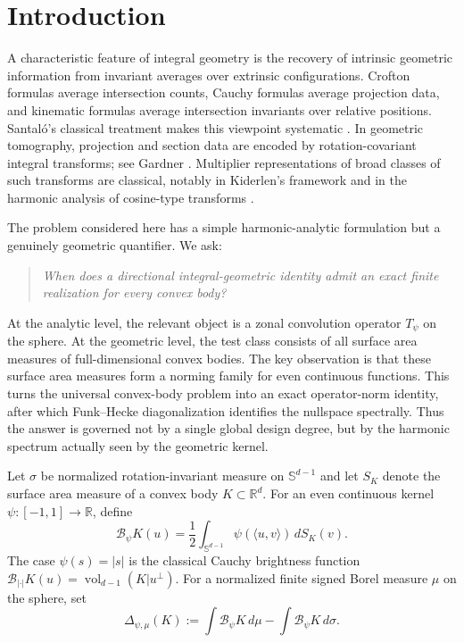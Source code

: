 \documentclass[12pt,a4paper]{article}
\newcommand{\Sph}{\mathbb S}
\newcommand{\R}{\mathbb R}
\newcommand{\cB}{\mathcal B}
\theoremstyle{plain}
\theoremstyle{definition}
\begin{document}
\section{Introduction}

A characteristic feature of integral geometry is the recovery of intrinsic geometric information from invariant averages over extrinsic configurations. Crofton formulas average intersection counts, Cauchy formulas average projection data, and kinematic formulas average intersection invariants over relative positions. Santal\'o's classical treatment makes this viewpoint systematic \cite{Santalo}. In geometric tomography, projection and section data are encoded by rotation-covariant integral transforms; see Gardner \cite{Gardner}. Multiplier representations of broad classes of such transforms are classical, notably in Kiderlen's framework \cite{Kiderlen} and in the harmonic analysis of cosine-type transforms \cite{GYY}.

The problem considered here has a simple harmonic-analytic formulation but a genuinely geometric quantifier. We ask:
\begin{quote}
\emph{When does a directional integral-geometric identity admit an exact finite realization for every convex body?}
\end{quote}
At the analytic level, the relevant object is a zonal convolution operator $T_\psi$ on the sphere. At the geometric level, the test class consists of all surface area measures of full-dimensional convex bodies. The key observation is that these surface area measures form a norming family for even continuous functions. This turns the universal convex-body problem into an exact operator-norm identity, after which Funk--Hecke diagonalization identifies the nullspace spectrally. Thus the answer is governed not by a single global design degree, but by the harmonic spectrum actually seen by the geometric kernel.

Let $\sigma$ be normalized rotation-invariant measure on $\Sph^{d-1}$ and let $S_K$ denote the surface area measure of a convex body $K\subset\R^d$. For an even continuous kernel $\psi:[-1,1]\to\R$, define
\begin{equation}\label{eq:kernel-observable-intro}
 \cB_\psi K(u)=\frac12\int_{\Sph^{d-1}}\psi(\langle u,v\rangle)\,dS_K(v).
\end{equation}
The case $\psi(s)=|s|$ is the classical Cauchy brightness function $\cB_{|\cdot|}K(u)=\operatorname{vol}_{d-1}(K|u^\perp)$. For a normalized finite signed Borel measure $\mu$ on the sphere, set
\[
 \Delta_{\psi,\mu}(K):=\int\cB_\psi K\,d\mu-\int\cB_\psi K\,d\sigma.
\]
\end{document}
